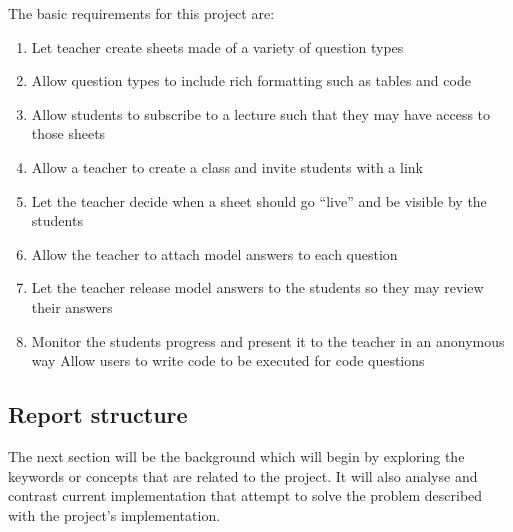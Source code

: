 \documentclass[11pt]{informatics-report}
\begin{document}
The basic requirements for this project are:
\begin{enumerate}
\item Let teacher create sheets made of a variety of question types
\item 	Allow question types to include rich formatting such as tables and code
\item 	Allow students to subscribe to a lecture such that they may have access to those sheets
\item 	Allow a teacher to create a class and invite students with a link
\item 	Let the teacher decide when a sheet should go “live” and be visible by the students
\item 	Allow the teacher to attach model answers to each question
\item Let the teacher release model answers to the students so they may review their answers
\item 	Monitor the students progress and present it to the teacher in an anonymous way
Allow users to write code to be executed for code questions

\end{enumerate}
\subsection{Report structure}
The next section will be the background which will begin by exploring the keywords or concepts that are related to the project.
It will also analyse and contrast current implementation that attempt to solve the problem described with the project's implementation.












\appendix



\end{document}
